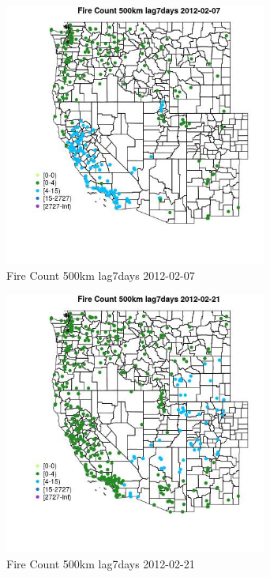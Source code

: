 \begin{figure} 
\centering  
\includegraphics[width=0.77\textwidth]{Code_Outputs/Report_ML_input_PM25_Step4_part_f_de_duplicated_aveswNAs_MapObsFire_Count_500km_lag7days2012-02-07.jpg} 
\caption{\label{fig:Report_ML_input_PM25_Step4_part_f_de_duplicated_aveswNAsMapObsFire_Count_500km_lag7days2012-02-07}Fire Count 500km lag7days 2012-02-07} 
\end{figure} 
 

\begin{figure} 
\centering  
\includegraphics[width=0.77\textwidth]{Code_Outputs/Report_ML_input_PM25_Step4_part_f_de_duplicated_aveswNAs_MapObsFire_Count_500km_lag7days2012-02-21.jpg} 
\caption{\label{fig:Report_ML_input_PM25_Step4_part_f_de_duplicated_aveswNAsMapObsFire_Count_500km_lag7days2012-02-21}Fire Count 500km lag7days 2012-02-21} 
\end{figure} 
 

